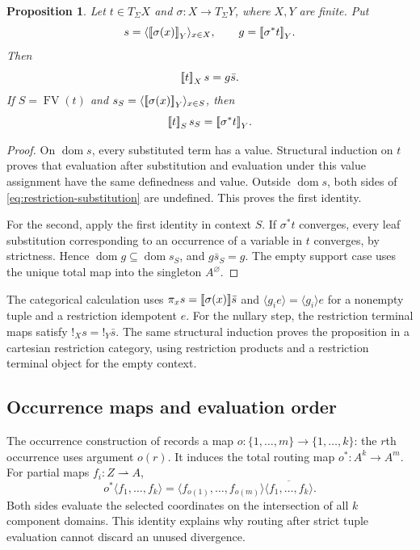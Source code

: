 \documentclass[11pt]{article}
\newtheorem{proposition}[theorem]{Proposition}
\theoremstyle{definition}
\newcommand{\dom}{\operatorname{dom}}
\newcommand{\FV}{\operatorname{FV}}
\newcommand{\den}[1]{\mathopen{[\mkern-3mu[}#1\mathclose{]\mkern-3mu]}}
\begin{document}
\begin{proposition}\label{prop:restriction-substitution}
Let $t\in T_\Sigma X$ and $\sigma:X\to T_\Sigma Y$, where
$X,Y$ are finite. Put
\[
 s=\langle\den{\sigma(x)}_Y\rangle_{x\in X},
 \qquad g=\den{\sigma^*t}_Y.
\]
Then
\begin{equation}\label{eq:restriction-substitution}
 \den t_X\,s=g\bar s.
\end{equation}
If $S=\FV(t)$ and
$s_S=\langle\den{\sigma(x)}_Y\rangle_{x\in S}$, then
\begin{equation}\label{eq:support-substitution}
 \den t_S\,s_S=\den{\sigma^*t}_Y.
\end{equation}
\end{proposition}
\begin{proof}
On $\dom s$, every substituted term has a value. Structural induction
on $t$ proves that evaluation after substitution and evaluation under
this value assignment have the same definedness and value. Outside
$\dom s$, both sides of \eqref{eq:restriction-substitution} are
undefined. This proves the first identity.

For the second, apply the first identity in context $S$. If
$\sigma^*t$ converges, every leaf substitution corresponding to an
occurrence of a variable in $t$ converges, by strictness. Hence
$\dom g\subseteq\dom s_S$, and $g\bar s_S=g$. The empty
support case uses the unique total map into the singleton $A^\varnothing$.
\end{proof}

The categorical calculation uses
$\pi_xs=\den{\sigma(x)}\bar s$ and
$\langle g_i e\rangle=\langle g_i\rangle e$ for a nonempty tuple
and a restriction idempotent $e$. For the nullary step, the restriction
terminal maps satisfy $!_X s=!_Y\bar s$.
The same structural induction proves the proposition
in a cartesian restriction category, using restriction products and
a restriction terminal object for the empty context.

\subsection{Occurrence maps and evaluation order}

The occurrence construction of \cite[Section 9 and Appendix A.5]{Notation}
records a map $o:\{1,\ldots,m\}\to\{1,\ldots,k\}$: the
$r$th occurrence uses argument $o(r)$. It induces the total routing map
$o^*:A^k\to A^m$. For partial maps $f_i:Z\rightharpoonup A$,
\begin{equation}\label{eq:routing}
 o^*\langle f_1,\ldots,f_k\rangle
 =\langle f_{o(1)},\ldots,f_{o(m)}\rangle
    \overline{\langle f_1,\ldots,f_k\rangle}.
\end{equation}
Both sides evaluate the selected coordinates on the intersection of
all $k$ component domains. This identity explains why routing after
strict tuple evaluation cannot discard an unused divergence.
\end{document}

